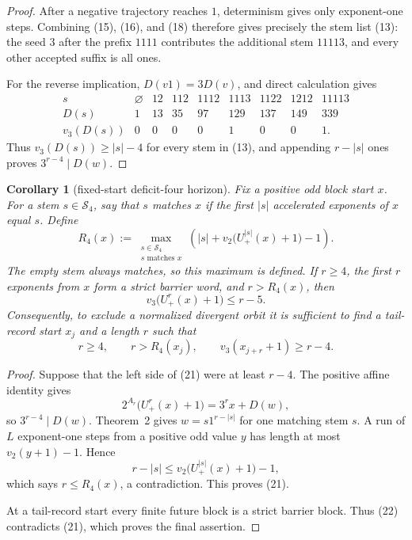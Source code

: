 \documentclass[11pt]{article}
\newtheorem{corollary}[theorem]{Corollary}
\newcommand{\Up}{U_+}
\begin{document}
\begin{proof}
After a negative trajectory reaches $1$, determinism gives only exponent-one
steps.  Combining (15), (16), and (18) therefore gives precisely the stem
list (13): the seed $3$ after the prefix $1111$ contributes the additional
stem $11113$, and every other accepted suffix is all ones.

For the reverse implication, $D(v1)=3D(v)$, and direct calculation gives
\[
\begin{array}{c|rrrrrrrr}
 s&\varnothing&12&112&1112&1113&1122&1212&11113\\ \hline
 D(s)&1&13&35&97&129&137&149&339\\
 v_3(D(s))&0&0&0&0&1&0&0&1.
\end{array}
\tag{19}
\]
Thus $v_3(D(s))\geq |s|-4$ for every stem in (13), and appending
$r-|s|$ ones proves $3^{r-4}\mid D(w)$.
\end{proof}

\begin{corollary}[fixed-start deficit-four horizon]
Fix a positive odd block start $x$.  For a stem $s\in\mathcal S_4$, say
that $s$ matches $x$ if the first $|s|$ accelerated exponents of $x$ equal
$s$.  Define
\[
  R_4(x):=
  \max_{\substack{s\in\mathcal S_4\\s\text{ matches }x}}
  \left(|s|+v_2\bigl(\Up^{|s|}(x)+1\bigr)-1\right).
  \tag{20}
\]
The empty stem always matches, so this maximum is defined.  If $r\geq4$,
the first $r$ exponents from $x$ form a strict barrier word, and
$r>R_4(x)$, then
\[
\boxed{
  v_3\bigl(\Up^r(x)+1\bigr)\leq r-5.}
\tag{21}
\]
Consequently, to exclude a normalized divergent orbit it is sufficient to
find a tail-record start $x_j$ and a length $r$ such that
\[
  r\geq4,
  \qquad
  r>R_4(x_j),
  \qquad
  v_3(x_{j+r}+1)\geq r-4.
  \tag{22}
\]
\end{corollary}

\begin{proof}
Suppose that the left side of (21) were at least $r-4$.  The positive affine
identity gives
\[
  2^{A_r}\bigl(\Up^r(x)+1\bigr)=3^rx+D(w),
  \tag{23}
\]
so $3^{r-4}\mid D(w)$.  Theorem~2 gives
$w=s1^{r-|s|}$ for one matching stem $s$.  A run of $L$ exponent-one steps
from a positive odd value $y$ has length at most $v_2(y+1)-1$.  Hence
\[
  r-|s|\leq v_2\bigl(\Up^{|s|}(x)+1\bigr)-1,
\]
which says $r\leq R_4(x)$, a contradiction.  This proves (21).

At a tail-record start every finite future block is a strict barrier block.
Thus (22) contradicts (21), which proves the final assertion.
\end{proof}
\end{document}
